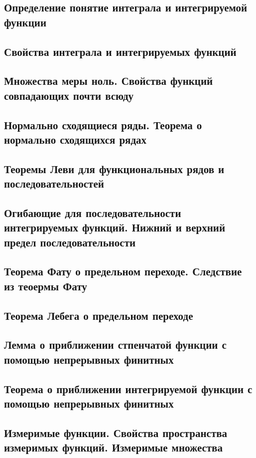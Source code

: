 \documentclass[a4paper]{article}
\theoremstyle{definition}
\theoremstyle{remark}
\begin{document}
    \subsection{ Определение понятие интеграла и интегрируемой функции}
    \subsection{ Свойства интеграла и интегрируемых функций}
    \subsection{ Множества меры ноль. Свойства функций совпадающих почти всюду}
    \subsection{ Нормально сходящиеся ряды. Теорема о нормально сходящихся рядах}
    \subsection{ Теоремы Леви для функциональных рядов и последовательностей}
    \subsection{ Огибающие для последовательности интегрируемых функций. Нижний и верхний предел последовательности}
    \subsection{ Теорема Фату о предельном переходе. Следствие из теоермы Фату}
    \subsection{ Теорема Лебега о предельном переходе}
    \subsection{ Лемма о приближении стпенчатой функции с помощью непрерывных финитных}
    \subsection{ Теорема о приближении интегрируемой функции с помощью непрерывных финитных}
    \subsection{ Измеримые функции. Свойства пространства измеримых функций. Измеримые множества}
\end{document}
